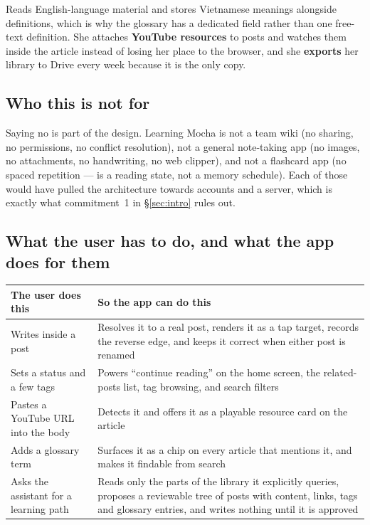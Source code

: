 \begin{mochabox}[title={Hoa --- learning a language and reading papers}]
Reads English-language material and stores Vietnamese meanings alongside definitions, which is why the
glossary has a dedicated  field rather than one free-text definition. She attaches
\textbf{YouTube resources} to posts and watches them inside the article instead of losing her place to the
browser, and she \textbf{exports} her library to Drive every week because it is the only copy.
\end{mochabox}

\subsection{Who this is not for}

Saying no is part of the design. Learning Mocha is not a team wiki (no sharing, no permissions, no
conflict resolution), not a general note-taking app (no images, no attachments, no handwriting, no
web clipper), and not a flashcard app (no spaced repetition ---  is a reading state, not a
memory schedule). Each of those would have pulled the architecture towards accounts and a server, which
is exactly what commitment~1 in \S\ref{sec:intro} rules out.

\subsection{What the user has to do, and what the app does for them}

\begin{tabularx}{\linewidth}{L{5.4cm} X}
\toprule
\textbf{The user does this} & \textbf{So the app can do this} \\
\midrule
Writes  inside a post &
Resolves it to a real post, renders it as a tap target, records the reverse edge, and keeps it correct
when either post is renamed \\
\addlinespace
Sets a status and a few tags &
Powers ``continue reading'' on the home screen, the related-posts list, tag browsing, and search filters \\
\addlinespace
Pastes a YouTube URL into the body &
Detects it and offers it as a playable resource card on the article \\
\addlinespace
Adds a glossary term &
Surfaces it as a chip on every article that mentions it, and makes it findable from search \\
\addlinespace
Asks the assistant for a learning path &
Reads only the parts of the library it explicitly queries, proposes a reviewable tree of posts with
content, links, tags and glossary entries, and writes nothing until it is approved \\
\bottomrule
\end{tabularx}
